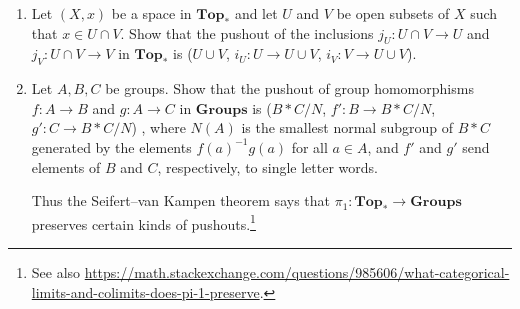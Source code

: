     \begin{enumerate}
        \item Let $(X,x)$ be a space in $\mathbf{Top}_*$ and let $U$ and $V$ be open subsets of $X$ such that $x \in U \cap V$.
        Show that the pushout of the inclusions $j_U: U \cap V \to U$ and $j_V:U \cap V \to V$ in $\mathbf{Top}_*$ is ($U \cup V$, $i_U: U \to U \cup V$, $i_V: V \to U \cup V$).
        \begin{center}
        \end{center}
        \item Let $A, B, C$ be groups. Show that the pushout of group homomorphisms  $f: A \to B$ and $g : A \to C$ in $\mathbf{Groups}$ is ($B * C / N$, $f':B \to B*C/N$, $g':C \to B*C/N$) , where $N(A)$ is the smallest normal subgroup of $B *C$ generated by the elements $f(a)^{-1} g(a)$ for all $a \in A$, and $f'$ and $g'$ send elements of $B$ and $C$, respectively, to single letter words.
        \begin{center}
        \end{center}    
        Thus the Seifert--van Kampen theorem says that $\pi_1: \mathbf{Top}_* \to \mathbf{Groups}$ preserves certain kinds of pushouts.\footnote{See also \url{https://math.stackexchange.com/questions/985606/what-categorical-limits-and-colimits-does-pi-1-preserve}.}
    \end{enumerate}